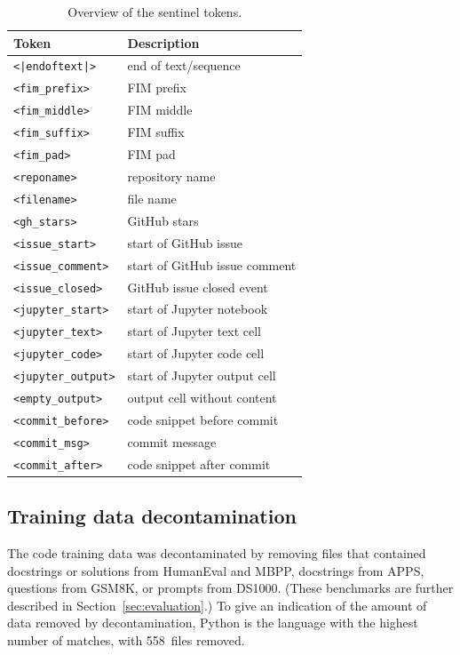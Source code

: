 \documentclass[10pt]{article} %
\begin{document}
\begin{table}[t]
\centering
\begin{tabular}{ll}
\toprule
\textbf{Token} & \textbf{Description}\\
\midrule
 \verb$<|endoftext|>$ & end of text/sequence \\ 
 \verb|<fim_prefix>| & FIM prefix  \\  
 \verb|<fim_middle>| & FIM middle \\
 \verb|<fim_suffix>| & FIM suffix \\
 \verb|<fim_pad>| & FIM pad \\
 \verb|<reponame>| & repository name \\
 \verb|<filename>| & file name  \\
 \verb|<gh_stars>| & GitHub stars\\
 \verb|<issue_start>| & start of GitHub issue \\
 \verb|<issue_comment>| & start of GitHub issue comment \\
 \verb|<issue_closed>| & GitHub issue closed event \\
 \verb|<jupyter_start>| & start of Jupyter notebook \\
 \verb|<jupyter_text>| & start of Jupyter text cell \\
 \verb|<jupyter_code>| & start of Jupyter code cell \\
 \verb|<jupyter_output>| & start of Jupyter output cell \\
 \verb|<empty_output>| & output cell without content \\
 \verb|<commit_before>| & code snippet before commit\\
 \verb|<commit_msg>| & commit message \\
 \verb|<commit_after>| & code snippet after commit\\
\bottomrule
\end{tabular}
\caption{Overview of the sentinel tokens. }\label{tab:sentinel_tokens}
\end{table}

\subsection{Training data decontamination}\label{sec:decontamination}

The code training data was decontaminated by removing files that contained 
docstrings or solutions from HumanEval and MBPP, docstrings from APPS, questions from GSM8K, or prompts from DS1000. (These benchmarks are further described in Section~\ref{sec:evaluation}.)
To give an indication of the amount of data removed by decontamination, Python is the language with the highest number of matches, with 558~files removed.
\end{document}
